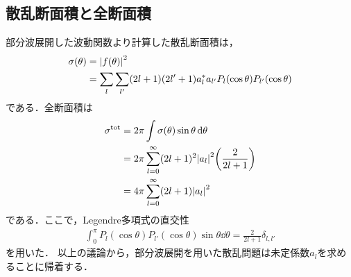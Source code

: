 \documentclass{report}
\begin{document}
  \subsection{散乱断面積と全断面積}
    部分波展開した波動関数より計算した散乱断面積は，
    \begin{align}
      \sigma(\theta) &= \abs{f(\theta)}^2 \\
      &= \sum_{l} \sum_{l'} (2l+1)(2l'+1) a_l^{*}a_{l'} P_l(\cos\theta) P_{l'}(\cos\theta)
    \end{align}
    である．全断面積は
    \begin{align}
      \sigma^{\mathrm{tot}} &= 2\pi \int \sigma(\theta) \sin\theta \dd{\theta} \\
      &= 2\pi \sum_{l=0}^{\infty} (2l+1)^2\abs{a_l}^2\qty(\frac{2}{2l+1}) \\
      &= 4\pi \sum_{l=0}^{\infty} (2l+1) \abs{a_l}^2
    \end{align}
    である．ここで，Legendre多項式の直交性
    \begin{align}
      \int_{0}^{\pi} P_l(\cos\theta)P_{l'}(\cos\theta) \sin\theta \dd{\theta} = \frac{2}{2l+1}\delta_{l,l'}
    \end{align}
    を用いた．
    以上の議論から，部分波展開を用いた散乱問題は未定係数$a_l$を求めることに帰着する．
\end{document}
